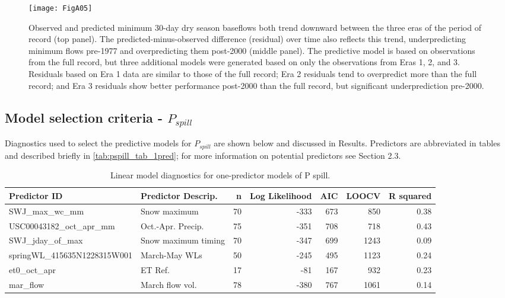\documentclass[hess, manuscript]{copernicus}
\begin{document}
\begin{figure}
\texttt{[image: FigA05]} \caption{\label{fig:v_min_over_time} Observed and predicted minimum 30-day dry season baseflows both trend downward between the three eras of the period of record (top panel). The predicted-minus-observed difference (residual) over time also reflects this trend, underpredicting minimum flows pre-1977 and overpredicting them post-2000 (middle panel). The predictive model is based on observations from the full record, but three additional models were generated based on only the observations from Eras 1, 2, and 3. Residuals based on Era 1 data are similar to those of the full record; Era 2 residuals tend to overpredict more than the full record; and Era 3 residuals show better performance post-2000 than the full record, but significant underprediction pre-2000.}\label{fig:v_min_over_time}
\end{figure}

\newpage

\subsection{\texorpdfstring{Model selection criteria -
$P_{spill}$}{Model selection criteria - P\_\{spill\}}}

Diagnostics used to select the predictive models for $P_{spill}$ are
shown below and discussed in Results. Predictors are abbreviated in
tables and described briefly in \autoref{tab:pspill_tab_1pred}; for more
information on potential predictors see Section 2.3.

\begin{table}[ht]
\centering
\caption{Linear model diagnostics for one-predictor models of P spill.} 
\label{tab:pspill_tab_1pred}
\begin{tabular}{llrrrrr}
  \hline
Predictor ID & Predictor Descrip. & n & Log Likelihood & AIC & LOOCV & R squared \\ 
  \hline
SWJ\_max\_wc\_mm & Snow maximum & 70 & -333 & 673 & 850 & 0.38 \\ 
  USC00043182\_oct\_apr\_mm & Oct.-Apr. Precip. & 75 & -351 & 708 & 718 & 0.43 \\ 
  SWJ\_jday\_of\_max & Snow maximum timing & 70 & -347 & 699 & 1243 & 0.09 \\ 
  springWL\_415635N1228315W001 & March-May WLs & 50 & -245 & 495 & 1123 & 0.24 \\ 
  et0\_oct\_apr & ET Ref. & 17 & -81 & 167 & 932 & 0.23 \\ 
  mar\_flow & March flow vol. & 78 & -380 & 767 & 1061 & 0.14 \\ 
   \hline
\end{tabular}
\end{table}
\end{document}
